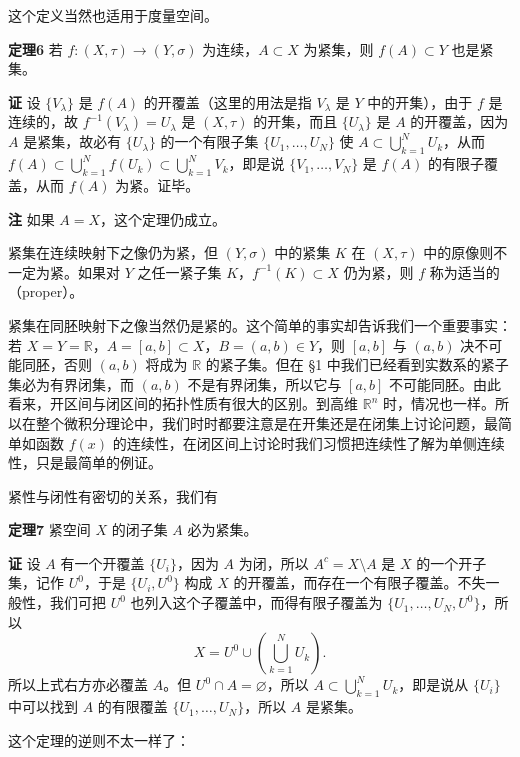 这个定义当然也适用于度量空间。

\noindent\textbf{定理6}\quad
若 $f:(X,\tau)\to(Y,\sigma)$ 为连续，$A\subset X$ 为紧集，则 $f(A)\subset Y$ 也是紧集。

\noindent\textbf{证}\quad
设 $\{V_\lambda\}$ 是 $f(A)$ 的开覆盖（这里的用法是指 $V_\lambda$ 是 $Y$ 中的开集），由于 $f$ 是连续的，故 $f^{-1}(V_\lambda)=U_\lambda$ 是 $(X,\tau)$ 的开集，而且 $\{U_\lambda\}$ 是 $A$ 的开覆盖，因为 $A$ 是紧集，故必有 $\{U_\lambda\}$ 的一个有限子集 $\{U_1,\ldots,U_N\}$ 使 $A\subset\bigcup_{k=1}^N U_k$，从而 $f(A)\subset\bigcup_{k=1}^N f(U_k)\subset\bigcup_{k=1}^N V_k$，即是说 $\{V_1,\ldots,V_N\}$ 是 $f(A)$ 的有限子覆盖，从而 $f(A)$ 为紧。证毕。

\noindent\textbf{注}\quad
如果 $A=X$，这个定理仍成立。

紧集在连续映射下之像仍为紧，但 $(Y,\sigma)$ 中的紧集 $K$ 在 $(X,\tau)$ 中的原像则不一定为紧。如果对 $Y$ 之任一紧子集 $K$，$f^{-1}(K)\subset X$ 仍为紧，则 $f$ 称为适当的（proper）。

紧集在同胚映射下之像当然仍是紧的。这个简单的事实却告诉我们一个重要事实：若 $X=Y=\mathbb R$，$A=[a,b]\subset X$，$B=(a,b)\in Y$，则 $[a,b]$ 与 $(a,b)$ 决不可能同胚，否则 $(a,b)$ 将成为 $\mathbb R$ 的紧子集。但在 §1 中我们已经看到实数系的紧子集必为有界闭集，而 $(a,b)$ 不是有界闭集，所以它与 $[a,b]$ 不可能同胚。由此看来，开区间与闭区间的拓扑性质有很大的区别。到高维 $\mathbb R^n$ 时，情况也一样。所以在整个微积分理论中，我们时时都要注意是在开集还是在闭集上讨论问题，最简单如函数 $f(x)$ 的连续性，在闭区间上讨论时我们习惯把连续性了解为单侧连续性，只是最简单的例证。

紧性与闭性有密切的关系，我们有

\noindent\textbf{定理7}\quad
紧空间 $X$ 的闭子集 $A$ 必为紧集。

\noindent\textbf{证}\quad
设 $A$ 有一个开覆盖 $\{U_i\}$，因为 $A$ 为闭，所以 $A^c=X\setminus A$ 是 $X$ 的一个开子集，记作 $U^0$，于是 $\{U_i,U^0\}$ 构成 $X$ 的开覆盖，而存在一个有限子覆盖。不失一般性，我们可把 $U^0$ 也列入这个子覆盖中，而得有限子覆盖为 $\{U_1,\ldots,U_N,U^0\}$，所以
\[
 X=U^0\cup\left(\bigcup_{k=1}^N U_k\right).
\]
所以上式右方亦必覆盖 $A$。但 $U^0\cap A=\varnothing$，所以 $A\subset\bigcup_{k=1}^N U_k$，即是说从 $\{U_i\}$ 中可以找到 $A$ 的有限覆盖 $\{U_1,\ldots,U_N\}$，所以 $A$ 是紧集。

这个定理的逆则不太一样了：

